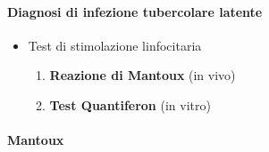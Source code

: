 \documentclass[italian,]{article}
\providecommand{\tightlist}{%
  \setlength{\itemsep}{0pt}\setlength{\parskip}{0pt}}
\begin{document}
\hypertarget{diagnosi-di-infezione-tubercolare-latente}{%
\paragraph{Diagnosi di infezione tubercolare
latente}\label{diagnosi-di-infezione-tubercolare-latente}}

\begin{itemize}
\tightlist
\item
  Test di stimolazione linfocitaria

  \begin{enumerate}
  \def\labelenumi{\arabic{enumi}.}
  \tightlist
  \item
    \textbf{Reazione di Mantoux} (in vivo)
  \item
    \textbf{Test Quantiferon} (in vitro)
  \end{enumerate}
\end{itemize}

\hypertarget{mantoux}{%
\paragraph{Mantoux}\label{mantoux}}
\end{document}
